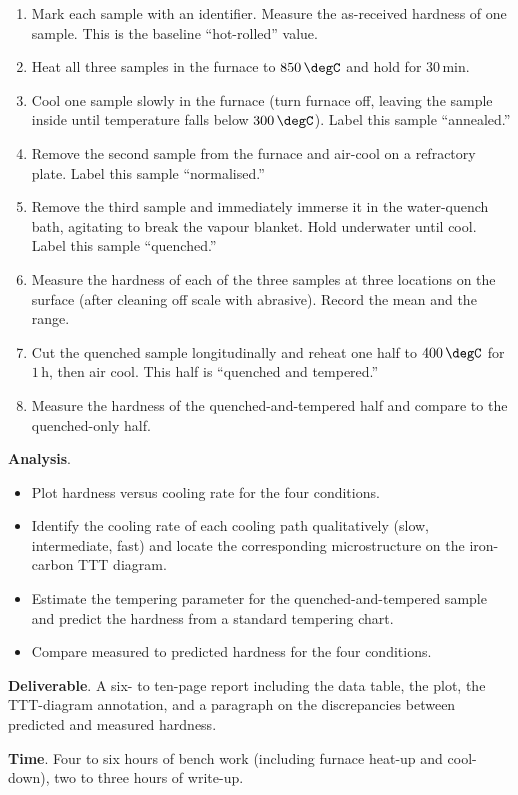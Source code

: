 \begin{project}
\begin{enumerate}[leftmargin=*]
\item Mark each sample with an identifier. Measure the as-received
  hardness of one sample. This is the baseline ``hot-rolled'' value.
\item Heat all three samples in the furnace to $850\,\degC$ and hold
  for $30\,\text{min}$.
\item Cool one sample slowly in the furnace (turn furnace off,
  leaving the sample inside until temperature falls below $300\,
  \degC$). Label this sample ``annealed.''
\item Remove the second sample from the furnace and air-cool on a
  refractory plate. Label this sample ``normalised.''
\item Remove the third sample and immediately immerse it in the
  water-quench bath, agitating to break the vapour blanket. Hold
  underwater until cool. Label this sample ``quenched.''
\item Measure the hardness of each of the three samples at three
  locations on the surface (after cleaning off scale with abrasive).
  Record the mean and the range.
\item Cut the quenched sample longitudinally and reheat one half to
  $400\,\degC$ for $1\,\text{h}$, then air cool. This half is
  ``quenched and tempered.''
\item Measure the hardness of the quenched-and-tempered half and
  compare to the quenched-only half.
\end{enumerate}

\textbf{Analysis}.

\begin{itemize}[leftmargin=*]
\item Plot hardness versus cooling rate for the four conditions.
\item Identify the cooling rate of each cooling path qualitatively
  (slow, intermediate, fast) and locate the corresponding
  microstructure on the iron-carbon TTT diagram.
\item Estimate the tempering parameter for the quenched-and-tempered
  sample and predict the hardness from a standard tempering chart.
\item Compare measured to predicted hardness for the four conditions.
\end{itemize}

\textbf{Deliverable}. A six- to ten-page report including the data
table, the plot, the TTT-diagram annotation, and a paragraph on the
discrepancies between predicted and measured hardness.

\textbf{Time}. Four to six hours of bench work (including furnace
heat-up and cool-down), two to three hours of write-up.
\end{project}

